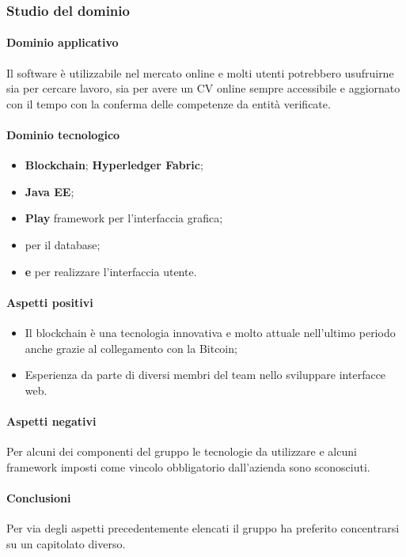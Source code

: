 	\subsubsection{Studio del dominio}
	\paragraph{Dominio applicativo} \Spazio
	Il software è utilizzabile nel mercato online e molti utenti potrebbero usufruirne sia per cercare lavoro, sia per avere un CV online sempre accessibile e aggiornato con il tempo con la conferma delle competenze da entità verificate.
	\paragraph{Dominio tecnologico} \Spazio
	\begin{itemize}
		\item \textbf{Blockchain};
		\textbf{Hyperledger Fabric};
		\item  \textbf{Java EE};
		\item  \textbf{Play} framework per l'interfaccia grafica;
		\item  \textbf{} per il database;
		\item  \textbf{ e } per realizzare l'interfaccia utente.
	\end{itemize}
	
	\paragraph{Aspetti positivi} \Spazio
	\begin{itemize}
		\item {Il blockchain è una tecnologia innovativa e molto attuale nell'ultimo periodo anche grazie al collegamento con la  Bitcoin;}
		\item {Esperienza da parte di diversi membri del team nello sviluppare interfacce web.}
	\end{itemize} 
	\paragraph{Aspetti negativi} \Spazio
	Per alcuni dei componenti del gruppo le tecnologie da utilizzare e alcuni framework imposti come vincolo obbligatorio dall'azienda sono sconosciuti.
	\paragraph{Conclusioni} \Spazio
	Per via degli aspetti precedentemente elencati il gruppo ha preferito concentrarsi su un capitolato diverso.
	
